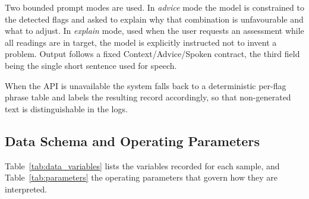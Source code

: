 Two bounded prompt modes are used. In \textit{advice} mode the model is constrained to the detected
flags and asked to explain why that combination is unfavourable and what to adjust. In
\textit{explain} mode, used when the user requests an assessment while all readings are in target,
the model is explicitly instructed not to invent a problem. Output follows a fixed
Context/Advice/Spoken contract, the third field being the single short sentence used for speech.

When the API is unavailable the system falls back to a deterministic per-flag phrase table and
labels the resulting record accordingly, so that non-generated text is distinguishable in the logs.

\subsection{Data Schema and Operating Parameters}
\label{subsec:schema}

Table~\ref{tab:data_variables} lists the variables recorded for each sample, and
Table~\ref{tab:parameters} the operating parameters that govern how they are interpreted.


